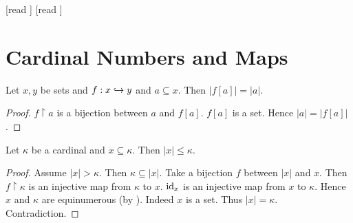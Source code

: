 \documentclass[10pt]{article}
\begin{document}
  \begin{imports}
    \begin{forthel}
      [read ]
      [read ]
    \end{forthel}
  \end{imports}


  \section*{Cardinal Numbers and Maps}  

  \begin{forthel}
    \begin{proposition}[id=SET_THEORY_06_5513850721927168,printid]
      Let $x, y$ be sets and $f : x \hookrightarrow y$ and $a \subseteq x$.
      Then $|f[a]| = |a|$.
    \end{proposition}
    \begin{proof}
      $f \restriction a$ is a bijection between $a$ and $f[a]$.
      $f[a]$ is a set.
      Hence $|a| = |f[a]|$.
    \end{proof}
  \end{forthel}

  \begin{forthel}
    \begin{proposition}
      Let $\kappa$ be a cardinal and $x \subseteq \kappa$.
      Then $|x| \leq \kappa$.
    \end{proposition}
    \begin{proof}
      Assume $|x| > \kappa$.
      Then $\kappa \subseteq |x|$.
      Take a bijection $f$ between $|x|$ and $x$.
      Then $f \restriction \kappa$ is an injective map from $\kappa$ to $x$.
      $\textrm{id}_{x}$ is an injective map from $x$ to $\kappa$.
      Hence $x$ and $\kappa$ are equinumerous (by ).
      Indeed $x$ is a set.
      Thus $|x| = \kappa$.
      Contradiction.
    \end{proof}
  \end{forthel}
\end{document}
